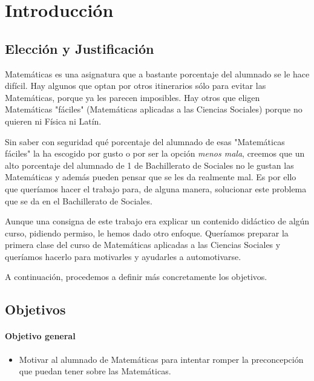 
\section{Introducción}


\subsection{Elección y Justificación}

Matemáticas es una asignatura que a bastante porcentaje del alumnado se le hace difícil. 
%
Hay algunos que optan por otros itinerarios sólo para evitar las Matemáticas, porque ya les parecen imposibles.
%
Hay otros que eligen Matemáticas "fáciles" (Matemáticas aplicadas a las Ciencias Sociales) porque no quieren ni Física ni Latín.

Sin saber con seguridad qué porcentaje del alumnado de esas "Matemáticas fáciles" la ha escogido por gusto o por ser la opción \textit{menos mala}, creemos que un alto porcentaje del alumnado de 1 de Bachillerato de Sociales no le gustan las Matemáticas y además pueden pensar que se les da realmente mal. 
%
Es por ello que queríamos hacer el trabajo para, de alguna manera, solucionar este problema que se da en el Bachillerato de Sociales.

Aunque una consigna de este trabajo era explicar un contenido didáctico de algún curso, pidiendo permiso, le hemos dado otro enfoque. 
%
Queríamos preparar la primera clase del curso de Matemáticas aplicadas a las Ciencias Sociales y queríamos hacerlo para motivarles y ayudarles a automotivarse.

A continuación, procedemos a definir más concretamente los objetivos.


\subsection{Objetivos}

\paragraph{Objetivo general}
\begin{itemize}
	\item Motivar al alumnado de Matemáticas para intentar romper la preconcepción que puedan tener sobre las Matemáticas. 
\end{itemize}

